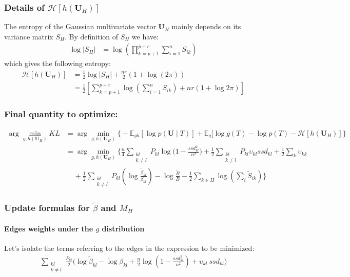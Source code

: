 \documentclass[11pt,a4paper]{article}
\newcommand{\argmin}{\arg\!\min}
\newcommand{\entr}{\mathcal{H}}
\newcommand{\Ubf}{\boldsymbol{U}}
\newcommand{\Esp}{\mathds{E}}
\begin{document}
 \subsubsection{Details of $\entr[h(\Ubf_H)]$}
 
 The entropy of the Gaussian multivariate vector $\Ubf_H$ mainly depends on its variance matrix $S_H$. By definition of $S_H$ we have:
 \begin{align*}
 \log |S_H| &= \log(\prod_{k=p+1}^{p+r} \sum_{i=1}^n S_{ik})
\end{align*}
which gives the following entropy:
\begin{align*}
\entr[h(\Ubf_H)]&= \frac{1}{2} \log |S_H| + \frac{nr}{2}(1+\log(2\pi))\\
 &=\frac{1}{2}\left[ \sum_{k=p+1}^{p+r} \log\left(\sum_{i=1}^n S_{ik}\right)+ nr(1+\log 2\pi )\right]
\end{align*}

\subsubsection{Final quantity to optimize:}
\begin{align*}
\argmin_{g,h(\Ubf_H)} KL  &=\argmin_{g,h(\Ubf_H)}  \Big\{-\Esp_{gh}[\log p(\Ubf \mid T) ] + \Esp_g[\log g(T) - \log p(T)-\entr[h(\Ubf_H)]\Big\}\\
&= \argmin_{g,h(\Ubf_H)}  \bigg\{ \frac{n}{4}\sum _{\substack{kl\\ k \neq l}} P_{kl} \log \Big(1-\frac{ssd_{kl}^2}{n^2}\Big) + \frac{1}{2}\sum_{\substack{kl\\ k \neq l}} P_{kl} \upsilon_{kl} ssd_{kl} + \frac{1}{2} \sum_{k} \upsilon_{kk} \\
& \;\;\;\; + \frac{1}{2}\sum_{\substack{kl\\ k\neq l}}P_{kl} \left(\log \frac{\widetilde{\beta}_{kl}}{{\beta}_{kl}}\right) - \log \frac{\widetilde{B}}{B} -\frac{1}{2}\sum_{k\in H} \log\left(\sum_i \widetilde{S}_{ik}\right) \bigg\}
\end{align*}
 
 
 \subsubsection{Update formulas for $\widetilde{\beta}$ and $M_H$ }

\paragraph{Edges weights under the $g$ distribution \\}
Let's isolate the terms referring to the edges in the expression to be minimized:
\begin{align*}
  \sum_{\substack{kl\\ k \neq l}} \frac{P_{kl}}{2}\Big(\log \widetilde{\beta}_{kl} - \log \beta_{kl} + \frac{n}{2} \log (1-\frac{ssd_{kl}^2}{n^2}) + \upsilon_{kl}\: ssd_{kl} \Big)   
\end{align*}
\end{document}
